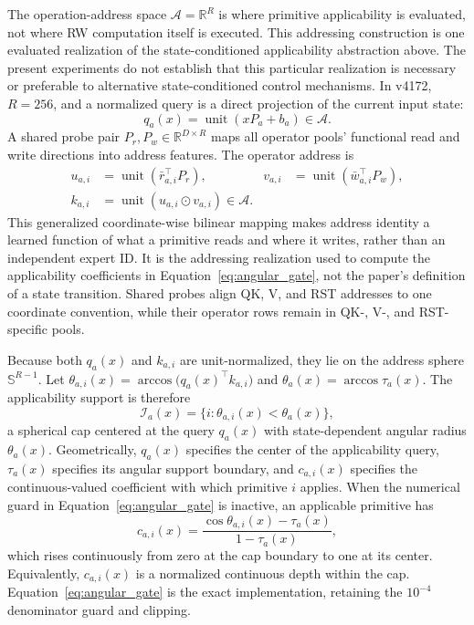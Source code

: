 \documentclass{article}
\newcommand{\R}{\mathbb{R}}
\newcommand{\od}{\mathbin{\odot}}
\begin{document}
The operation-address space \(\mathcal{A}=\R^R\) is where primitive
applicability is evaluated, not where RW computation itself is executed. This
addressing construction is one evaluated realization of the state-conditioned
applicability abstraction above. The present experiments do not establish that
this particular realization is necessary or preferable to alternative
state-conditioned control mechanisms. In v4172, \(R=256\), and a normalized
query is a direct projection of the current input state:
\begin{equation}
q_a(x)=\operatorname{unit}(xP_a+b_a)\in\mathcal{A}.
\label{eq:query}
\end{equation}
A shared probe pair \(P_r,P_w\in\R^{D\times R}\) maps all operator pools'
functional read and write directions into address features. The
operator address is
\begin{align}
u_{a,i}&=\operatorname{unit}(\bar r_{a,i}^{\top}P_r),&
v_{a,i}&=\operatorname{unit}(\bar w_{a,i}^{\top}P_w),\nonumber\\
k_{a,i}&=\operatorname{unit}(u_{a,i}\od v_{a,i})\in\mathcal{A}.
\label{eq:rw_address}
\end{align}
This generalized coordinate-wise bilinear mapping makes address identity a
learned function of what a primitive reads and where it writes, rather than an
independent expert ID. It is the addressing realization used to compute the
applicability coefficients in Equation~\ref{eq:angular_gate}, not the paper's
definition of a state transition. Shared probes align QK, V, and RST addresses
to one coordinate convention, while their operator rows remain in QK-, V-, and
RST-specific pools.

Because both \(q_a(x)\) and \(k_{a,i}\) are unit-normalized, they lie on the
address sphere \(\mathbb{S}^{R-1}\). Let
\(\theta_{a,i}(x)=\arccos\!\big(q_a(x)^\top k_{a,i}\big)\) and
\(\theta_a(x)=\arccos\tau_a(x)\). The applicability support is therefore
\[
\mathcal{I}_a(x)
=\{i:\theta_{a,i}(x)<\theta_a(x)\},
\]
a spherical cap centered at the query \(q_a(x)\) with state-dependent angular
radius \(\theta_a(x)\). Geometrically, \(q_a(x)\) specifies the center of the
applicability query, \(\tau_a(x)\) specifies its angular support boundary, and
\(c_{a,i}(x)\) specifies the continuous-valued coefficient with which primitive \(i\)
applies. When the
numerical guard in Equation~\ref{eq:angular_gate} is inactive, an applicable
primitive has
\[
c_{a,i}(x)=
\frac{\cos\theta_{a,i}(x)-\tau_a(x)}{1-\tau_a(x)},
\]
which rises continuously from zero at the cap boundary to one at its center.
Equivalently, \(c_{a,i}(x)\) is a normalized continuous depth within the cap.
Equation~\ref{eq:angular_gate} is the exact implementation, retaining the
\(10^{-4}\) denominator guard and clipping.
\end{document}
